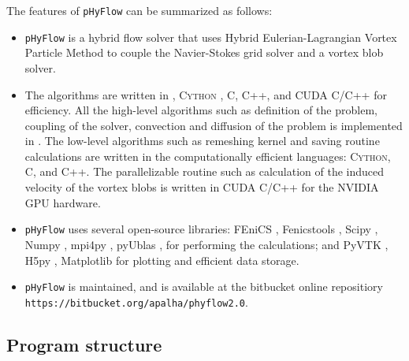 The features of \texttt{pHyFlow} can be summarized as follows:
\begin{itemize}
\item \texttt{pHyFlow} is a hybrid flow solver that uses Hybrid Eulerian-Lagrangian Vortex Particle Method to couple the Navier-Stokes grid solver and a vortex blob solver.
\item The algorithms are written in \python, \textsc{Cython} \cite{Behnel2011}, C, C++, and CUDA C/C++ for efficiency. All the high-level algorithms such as definition of the problem, coupling of the solver, convection and diffusion of the problem is implemented in \python. The low-level algorithms such as remeshing kernel and saving routine calculations are written in the computationally efficient languages: \textsc{Cython}, C, and C++. The parallelizable routine such as calculation of the induced velocity of the vortex blobs is written in CUDA C/C++ for the NVIDIA GPU hardware.
\item \texttt{pHyFlow} uses several open-source libraries: FEniCS \cite{Logg2012b}, Fenicstools \cite{fenicstools}, Scipy \cite{scipyLibrary}, Numpy \cite{VanDerWalt2011}, mpi4py \cite{Dalcin2008}, pyUblas \cite{pyublasLink}, for performing the calculations; and PyVTK \cite{pyublasLink}, H5py \cite{collette2013python}, Matplotlib \cite{Hunter:2007} for plotting and efficient data storage.
\item \texttt{pHyFlow} is maintained, and is available at the bitbucket online repositiory\\ \texttt{https://bitbucket.org/apalha/phyflow2.0}.
\end{itemize}


\subsection{Program structure}

